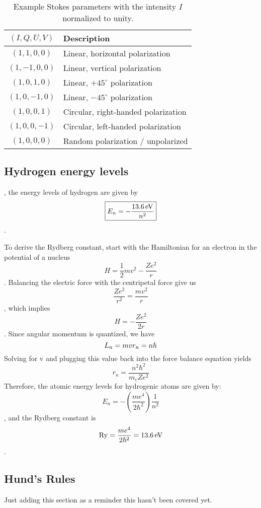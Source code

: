 \begin{table}[ht]
\centering
\begin{tabular}{cl}
\toprule
$(I,Q,U,V)$ & Description \\
\midrule
$(1,1,0,0)$ & Linear, horizontal polarization \\
$(1,-1,0,0)$ & Linear, vertical polarization \\
$(1,0,1,0)$ & Linear, $+45^\circ$ polarization \\
$(1,0,-1,0)$ & Linear, $-45^\circ$ polarization \\
$(1,0,0,1)$ & Circular, right-handed polarization \\
$(1,0,0,-1)$ & Circular, left-handed polarization \\
$(1,0,0,0)$ & Random polarization / unpolarized \\
\bottomrule
\end{tabular}
\caption{Example Stokes parameters with the intensity $I$ normalized to unity.}
\label{tab:stokes}
\end{table}

\subsection{Hydrogen energy levels}
, the energy levels of hydrogen are given by
\begin{dmath}\boxed{
E_n = -\frac{13.6\,{\rm eV}}{n^2}
}\end{dmath}.

To derive the Rydberg constant, start with the Hamiltonian for an electron in the
potential of a nucleus
\begin{dmath}
H = \frac{1}{2}mv^2 - \frac{Ze^2}{r}
\end{dmath}.
Balancing the electric force with the centripetal force give us
\begin{dmath*}
\frac{Ze^2}{r^2} = \frac{mv^2}{r}
\end{dmath*},
which implies
\begin{dmath}
H = -\frac{Ze^2}{2r}
\end{dmath}.
Since angular momentum is quantized, we have
\begin{dmath}
L_n = mvr_n \nolinebreak = n\hbar
\end{dmath}
Solving for v and plugging this value back into the force balance equation yields
\begin{dmath*}
r_n = \frac{n^2\hbar^2}{m_eZe^2}
\end{dmath*}
Therefore, the atomic energy levels for hydrogenic atoms are given by:
\begin{dmath}
E_n = -\left(\frac{me^4}{2\hbar^2}\right)\frac{1}{n^2}
\end{dmath},
and the Rydberg constant is
\begin{dmath}
{\rm Ry} = \frac{me^4}{2\hbar^2} \nolinebreak = 13.6\,{\rm eV}
\end{dmath}.

\subsection{Hund's Rules}
Just adding this section as a reminder this hasn't been covered yet.

